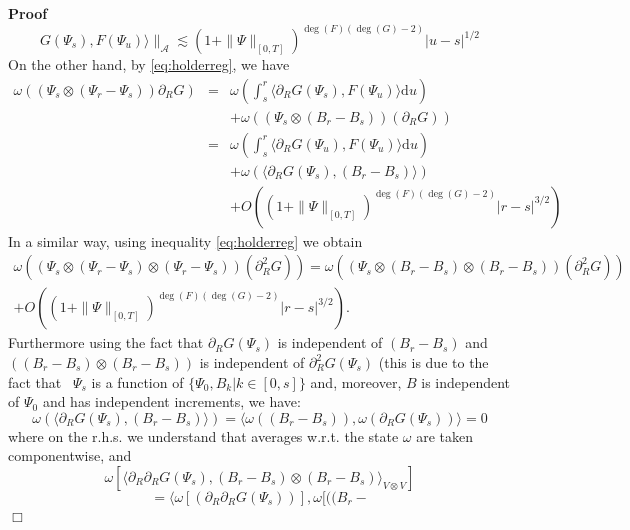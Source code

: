 \documentclass{article}
\newcommand{\mathd}{\mathrm{d}}
\newcommand{\nobracket}{}
\newenvironment{proof}{\noindent\textbf{Proof\ }}{\hspace*{\fill}$\Box$\medskip}
\begin{document}
\begin{proof}
\begin{equation}
    G (\Psi_s), F (\Psi_u) \rangle \|_{\mathcal{A}} \lesssim (1 + \| \Psi
    \|_{[0, T]})^{\deg (F) (\deg (G) - 2)} | u - s |^{1 / 2}
    \label{eq:holderreg3}
  \end{equation}
  On the other hand, by {\eqref{eq:holderreg}}, we have
  \begin{equation}
    \begin{array}{lll}
      \omega ((\Psi_s \otimes (\Psi_r - \Psi_s)) \partial_R G) & = & \omega
      \left( \int_s^r \langle \partial_R G (\Psi_s), F (\Psi_u) \rangle \mathd
      u \right)\\
      &  & + \omega ((\Psi_s \otimes (B_r - B_s)) (\partial_R G))\\
      & = & \omega \left( \int_s^r \langle \partial_R G (\Psi_u), F (\Psi_u)
      \rangle \mathd u \right)\\
      &  & + \omega (\langle \partial_R G (\Psi_s), (B_r - B_s) \rangle)\\
      &  & + O ((1 + \| \Psi \|_{[0, T]})^{\deg (F) (\deg (G) - 2)} | r - s
      |^{3 / 2})
    \end{array} \label{eq:holderreg4}
  \end{equation}
  In a similar way, using inequality {\eqref{eq:holderreg}} we obtain
  \begin{equation}
    \begin{array}{c}
      \omega ((\Psi_s \otimes (\Psi_r - \Psi_s) \otimes (\Psi_r - \Psi_s))
      (\partial_R^2 G)) = \omega ((\Psi_s \otimes (B_r - B_s) \otimes (B_r -
      B_s)) (\partial_R^2 G))\\
      + O ((1 + \| \Psi \|_{[0, T]})^{\deg (F) (\deg (G) - 2)} | r - s |^{3 /
      2}) .
    \end{array}
  \end{equation}
  Furthermore using the fact that $\partial_R G (\Psi_s)$ is independent of
  $(B_r - B_s)$ and $((B_r - B_s) \otimes (B_r - B_s))$ is independent of
  $\partial_R^2 G (\Psi_s)$ (this is due to the fact that \ $\Psi_s$ is a
  function of $\nobracket \{ \Psi_0, B_k | \nobracket \nobracket k \in [0, s]
  \}$ and, moreover, $B$ is independent of $\Psi_0$ and has independent
  increments, we have:
  \[ \omega (\langle \partial_R G (\Psi_s), (B_r - B_s) \rangle) = \langle
     \omega ((B_r - B_s)), \omega (\partial_R G (\Psi_s)) \rangle = 0 \]
  where on the r.h.s. we understand that averages w.r.t. the state $\omega$
  are taken componentwise, and
  \[ \omega [\langle \partial_R \partial_R G (\Psi_s), (B_r - B_s) \otimes
     (B_r - B_s) \rangle_{V \otimes V}] \]
  \[ = \langle \omega [(\partial_R \partial_R G (\Psi_s))], \omega [((B_r -
\]
\end{proof}
\end{document}
